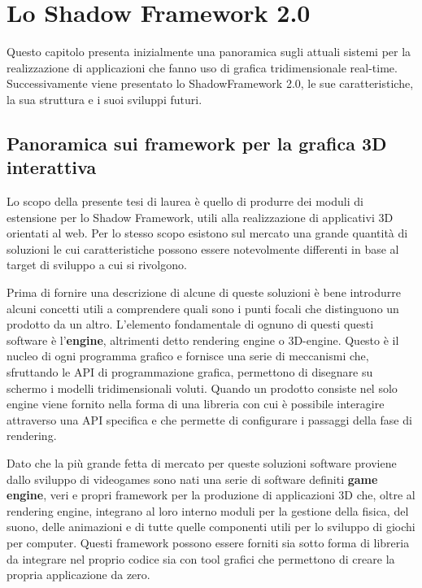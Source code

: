 
\chapter{Lo Shadow Framework 2.0}
\label{ch:shadowframework}
Questo capitolo presenta inizialmente una panoramica sugli attuali sistemi per la realizzazione di applicazioni che fanno uso di grafica tridimensionale real-time. Successivamente viene presentato lo ShadowFramework 2.0, le sue caratteristiche, la sua struttura e i suoi sviluppi futuri.

\section{Panoramica sui framework per la grafica 3D interattiva}
\label{sec:panoramicastrumenti}
Lo scopo della presente tesi di laurea \`e quello di produrre dei moduli di estensione per lo Shadow Framework, utili alla realizzazione di applicativi 3D orientati al web. 
Per lo stesso scopo esistono sul mercato una grande quantit\`a di soluzioni le cui caratteristiche possono essere notevolmente differenti in base al target di sviluppo a cui si rivolgono.

Prima di fornire una descrizione di alcune di queste soluzioni \`e bene introdurre alcuni concetti utili a comprendere quali sono i punti focali che distinguono un prodotto da un altro. L'elemento fondamentale di ognuno di questi questi software \`e l'\textbf{engine}, altrimenti detto rendering engine o 3D-engine. Questo \`e il nucleo di ogni programma grafico e fornisce una serie di meccanismi che, sfruttando le \ac{API} di programmazione grafica, permettono di disegnare su schermo i modelli tridimensionali voluti. Quando un prodotto consiste nel solo engine viene fornito nella forma di una libreria con cui \`e possibile interagire attraverso una \ac{API} specifica e che permette di configurare i passaggi della fase di rendering.

Dato che la pi\`u grande fetta di mercato per queste soluzioni software proviene dallo sviluppo di videogames sono nati una serie di software definiti \textbf{game engine}, veri e propri framework per la produzione di applicazioni 3D che, oltre al rendering engine, integrano al loro interno moduli per la gestione della fisica, del suono, delle animazioni e di tutte quelle componenti utili per lo sviluppo di giochi per computer. Questi framework possono essere forniti sia sotto forma di libreria da integrare nel proprio codice sia con tool grafici che permettono di creare la propria applicazione da zero.

